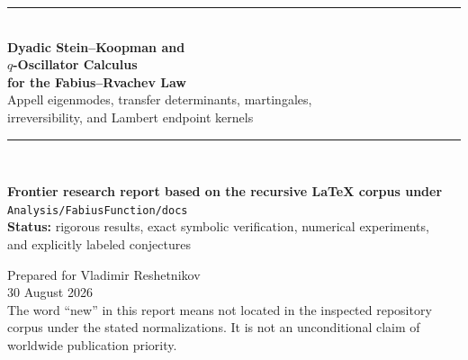 \documentclass[11pt,a4paper]{article}
\theoremstyle{definition}
\theoremstyle{remark}
\begin{document}
\hypersetup{pageanchor=false}

\begin{titlepage}
\thispagestyle{empty}
\begin{center}
\vspace*{1.0cm}
{\color{navy}\rule{0.92\textwidth}{1.2pt}}\\[1.0cm]
{\fontsize{27}{32}\selectfont\bfseries\color{navy}
Dyadic Stein--Koopman and\\[0.18em]
$q$-Oscillator Calculus\\[0.18em]
for the Fabius--Rvachev Law}\\[0.8cm]
{\Large\color{teal}
Appell eigenmodes, transfer determinants, martingales,\\
irreversibility, and Lambert endpoint kernels}\\[1.0cm]
{\color{navy}\rule{0.92\textwidth}{1.2pt}}\\[1.25cm]

\begin{tcolorbox}[width=0.88\textwidth,colback=lightblue,colframe=navy,arc=3pt,boxrule=0.8pt]
\centering
\textbf{Frontier research report based on the recursive LaTeX corpus under}\\[0.35em]
\texttt{Analysis/FabiusFunction/docs}\\[0.45em]
\textbf{Status:} rigorous results, exact symbolic verification, numerical experiments,\\
and explicitly labeled conjectures
\end{tcolorbox}

\vfill
{\large Prepared for Vladimir Reshetnikov}\\[0.35cm]
{\large 30 August 2026}\\[0.8cm]
{\small The word ``new'' in this report means not located in the inspected repository corpus under the stated normalizations. It is not an unconditional claim of worldwide publication priority.}
\end{center}
\end{titlepage}
\hypersetup{pageanchor=true}

\end{document}
